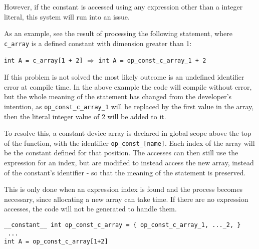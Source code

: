 However, if the constant is accessed using any expression other than a integer literal, this system will run into an issue.
\par As an example, see the result of processing the following statement, where \verb|c_array| is a defined constant with dimension greater than 1:
\begin{center}
\lstinline|int A = c_array[1 + 2]| \hspace{1cm}$\Rightarrow$\hspace{1cm} \lstinline |int A = op_const_c_array_1 + 2|
\end{center}

If this problem is not solved the most likely outcome is an undefined identifier error at compile time. In the above example the code will compile without error, but the whole meaning of the statement has changed from the developer's intention, as \verb|op_const_c_array_1| will be replaced by the first value in the array, then the literal integer value of 2 will be added to it.
\par
To resolve this, a constant device array is declared in global scope above the top of the function, with the identifier \verb|op_const_[name]|. Each index of the array will be the constant defined for that position. The accesses can then still use the expression for an index, but are modified to instead access the new array, instead of the constant's identifier - so that the meaning of the statement is preserved.
\par This is only done when an expression index is found and the process becomes necessary, since allocating a new array can take time. If there are no expression accesses, the code will not be generated to handle them.\\
\begin{lstlisting}[backgroundcolor=\color{green!20}]
__constant__ int op_const_c_array = { op_const_c_array_1, ..._2, }
 ...
int A = op_const_c_array[1+2]
\end{lstlisting}

